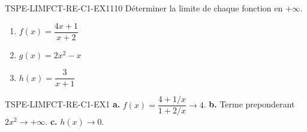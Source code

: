 

\begin{exercice}{TSPE-LIMFCT-RE-C1-EX1}{1}{10}
Déterminer la limite de chaque fonction en $+\infty$.
\begin{enumerate}
  \item $f(x) = \dfrac{4x+1}{x+2}$
  \item $g(x) = 2x^2 - x$
  \item $h(x) = \dfrac{3}{x+1}$
\end{enumerate}
\end{exercice}


\begin{corrige}{TSPE-LIMFCT-RE-C1-EX1}
\textbf{a.} $f(x) = \dfrac{4+1/x}{1+2/x} \to 4$. \quad \textbf{b.} Terme preponderant $2x^2 \to +\infty$. \quad \textbf{c.} $h(x) \to 0$.
\end{corrige}
